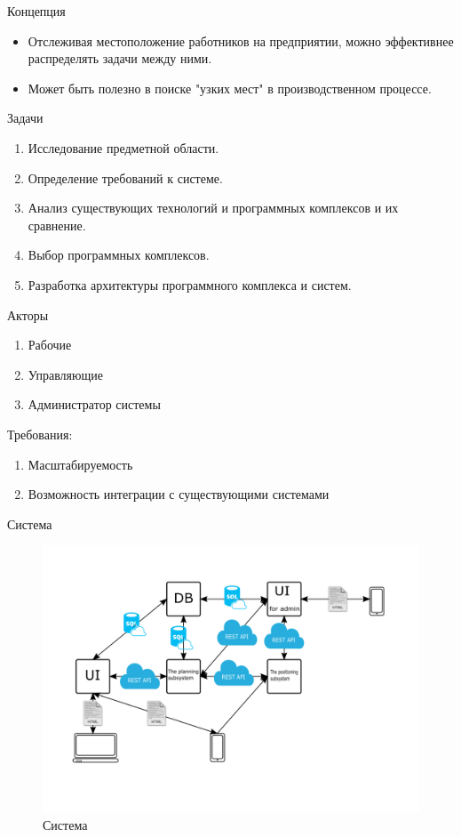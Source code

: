 \begin{frame}{Концепция}
	\begin{itemize}
		\item Отслеживая местоположение работников на предприятии,
		можно эффективнее распределять задачи между ними.
		\item Может быть полезно в поиске "узких мест" в производственном процессе.
	\end{itemize}
	
\end{frame}

\begin{frame}{Задачи}
	
	\begin{enumerate}
		\item Исследование предметной области.
	
		\item Определение требований к системе.
	
		\item Анализ существующих технологий и программных комплексов и их сравнение.
	
		\item Выбор программных комплексов.
	
		\item Разработка архитектуры программного комплекса и систем.
	
	\end{enumerate}
\end{frame}

\begin{frame}{Акторы}
	\begin{enumerate}
		\item Рабочие
		\item Управляющие
		\item Администратор системы
	\end{enumerate}
	Требования:
	\begin{enumerate}
		\item Масштабируемость
		\item Возможность интеграции с существующими системами
	\end{enumerate}
\end{frame}

\begin{frame}{Система}
	\begin{figure}
		\includegraphics[width=0.65\linewidth]{images/beacon-sys.png}
		\caption{Система}
	\end{figure}
\end{frame}


